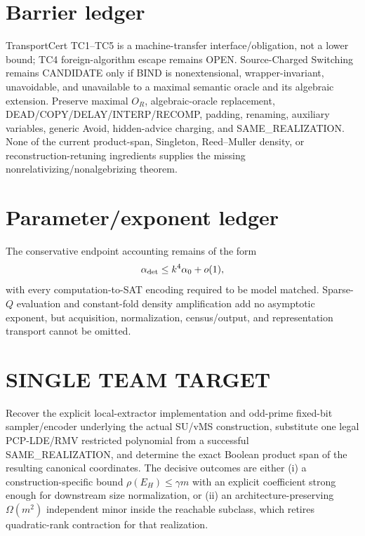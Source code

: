 \documentclass[11pt]{article}
\begin{document}
\section*{Barrier ledger}
TransportCert TC1--TC5 is a machine-transfer interface/obligation, not a lower bound; TC4 foreign-algorithm escape remains OPEN. Source-Charged Switching remains CANDIDATE only if BIND is nonextensional, wrapper-invariant, unavoidable, and unavailable to a maximal semantic oracle and its algebraic extension. Preserve maximal $O_R$, algebraic-oracle replacement, DEAD/COPY/DELAY/INTERP/RECOMP, padding, renaming, auxiliary variables, generic Avoid, hidden-advice charging, and SAME_REALIZATION. None of the current product-span, Singleton, Reed--Muller density, or reconstruction-retuning ingredients supplies the missing nonrelativizing/nonalgebrizing theorem.

\section*{Parameter/exponent ledger}
The conservative endpoint accounting remains of the form
\[
\alpha_{\rm det}\le k^4\alpha_0+o(1),
\]
with every computation-to-SAT encoding required to be model matched. Sparse-$Q$ evaluation and constant-fold density amplification add no asymptotic exponent, but acquisition, normalization, census/output, and representation transport cannot be omitted.

\section*{SINGLE TEAM TARGET}
Recover the explicit local-extractor implementation and odd-prime fixed-bit sampler/encoder underlying the actual SU/vMS construction, substitute one legal PCP-LDE/RMV restricted polynomial from a successful SAME_REALIZATION, and determine the exact Boolean product span of the resulting canonical coordinates. The decisive outcomes are either (i) a construction-specific bound $\rho(E_H)\le\gamma m$ with an explicit coefficient strong enough for downstream size normalization, or (ii) an architecture-preserving $\Omega(m^2)$ independent minor inside the reachable subclass, which retires quadratic-rank contraction for that realization.
\end{document}
